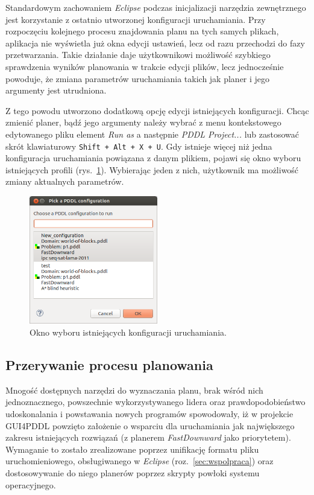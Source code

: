 Standardowym zachowaniem \emph{Eclipse} podczas inicjalizacji narzędzia zewnętrznego jest korzystanie z ostatnio utworzonej konfiguracji uruchamiania. Przy rozpoczęciu kolejnego procesu znajdowania planu na tych samych plikach, aplikacja nie wyświetla już okna edycji ustawień, lecz od razu przechodzi do fazy przetwarzania. Takie działanie daje użytkownikowi możliwość szybkiego sprawdzenia wyników planowania w trakcie edycji plików, lecz jednocześnie powoduje, że zmiana parametrów uruchamiania takich jak planer i jego argumenty jest utrudniona.

Z tego powodu utworzono dodatkową opcję edycji istniejących konfiguracji. Chcąc zmienić planer, bądź jego argumenty należy wybrać z menu kontekstowego edytowanego pliku element \emph{Run as} a następnie \emph{PDDL Project...} lub zastosować skrót klawiaturowy \texttt{Shift~+~Alt~+~X~+~U}. Gdy istnieje więcej niż jedna konfiguracja uruchamiania powiązana z danym plikiem, pojawi się okno wyboru istniejących profili (rys.~\ref{fig:run_configuration_choice}). Wybierając jeden z nich, użytkownik ma możliwość zmiany aktualnych parametrów.

\begin{figure}[h!]
    \centering
    \includegraphics[width=0.5\textwidth]{img/run_configuration_choice}
    \caption{Okno wyboru istniejących konfiguracji uruchamiania.}
    \label{fig:run_configuration_choice}
\end{figure}

\subsection{Przerywanie procesu planowania}
\label{subsec:przerywanie}
Mnogość dostępnych narzędzi do wyznaczania planu, brak wśród nich jednoznacznego, powszechnie wykorzystywanego lidera oraz prawdopodobieństwo udoskonalania i powstawania nowych programów spowodowały, iż w projekcie GUI4PDDL powzięto założenie o wsparciu dla uruchamiania jak największego zakresu istniejących rozwiązań (z planerem \emph{FastDownward} jako priorytetem). Wymaganie to zostało zrealizowane poprzez unifikację formatu pliku uruchomieniowego, obsługiwanego w \emph{Eclipse} (roz.~\ref{sec:wspolpraca}) oraz dostosowywanie do niego planerów poprzez skrypty powłoki systemu operacyjnego.

